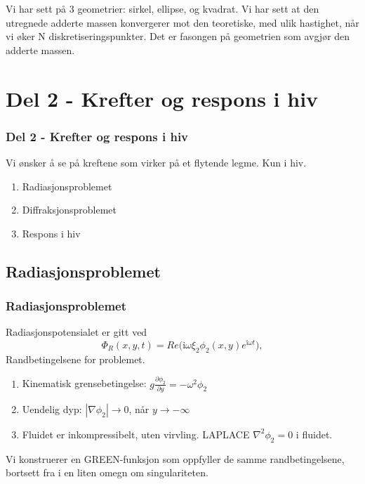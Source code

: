 \documentclass{beamer}
\begin{document}
\begin{frame}
Vi har sett på 3 geometrier: sirkel, ellipse, og kvadrat. Vi har sett at den utregnede adderte massen konvergerer mot den teoretiske, med ulik hastighet, når vi øker N diskretiseringspunkter. Det er fasongen på geometrien som avgjør den adderte massen. 
\end{frame}




\section{Del 2 - Krefter og respons i hiv}
\begin{frame}
  \frametitle{Del 2 - Krefter og respons i hiv}
  Vi ønsker å se på kreftene som virker på et flytende legme. Kun i hiv. 
  \begin{enumerate}
  \item Radiasjonsproblemet
  \item Diffraksjonsproblemet
  \item Respons i hiv
  \end{enumerate}
\end{frame}

\subsection{Radiasjonsproblemet}
\begin{frame}
  \frametitle{Radiasjonsproblemet}
  Radiasjonspotensialet er gitt ved 
  \begin{equation}
	\Phi_R(x,y,t) = Re\Big( \mathrm{i} \omega \xi_2 \phi_2(x,y) e^{\mathrm{i} \omega t} \Big), 
  \end{equation}
  Randbetingelsene for problemet.  %
  \begin{enumerate}
  \item Kinematisk grensebetingelse: $g \frac{\partial \phi_2}{\partial y} = - \omega^2 \phi_2$
  \item Uendelig dyp: $|\nabla \phi_2| \to 0$, når $y \to - \infty$
  \item Fluidet er inkompressibelt, uten virvling. LAPLACE $\nabla^2 \phi_2  = 0$ i fluidet.      
  \end{enumerate}
 Vi konstruerer en GREEN-funksjon som oppfyller de samme randbetingelsene, bortsett fra i en liten omegn om singulariteten. 
\end{frame}
\end{document}
